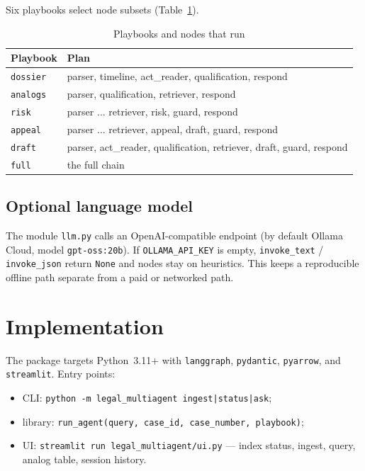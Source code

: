 \documentclass[preprint,12pt]{elsarticle}
\begin{document}
Six playbooks select node subsets (Table~\ref{tab:playbooks}).

\begin{table}[t]
\centering
\caption{Playbooks and nodes that run}
\label{tab:playbooks}
\begin{tabularx}{\linewidth}{lX}
\toprule
Playbook & Plan \\
\midrule
\texttt{dossier} & parser, timeline, act\_reader, qualification, respond \\
\texttt{analogs} & parser, qualification, retriever, respond \\
\texttt{risk} & parser $\ldots$ retriever, risk, guard, respond \\
\texttt{appeal} & parser $\ldots$ retriever, appeal, draft, guard, respond \\
\texttt{draft} & parser, act\_reader, qualification, retriever, draft, guard, respond \\
\texttt{full} & the full chain \\
\bottomrule
\end{tabularx}
\end{table}

\subsection{Optional language model}

The module \texttt{llm.py} calls an OpenAI-compatible endpoint (by default Ollama Cloud, model \texttt{gpt-oss:20b}). If \texttt{OLLAMA\_API\_KEY} is empty, \texttt{invoke\_text} / \texttt{invoke\_json} return \texttt{None} and nodes stay on heuristics. This keeps a reproducible offline path separate from a paid or networked path.

\section{Implementation}

The package targets Python~3.11+ with \texttt{langgraph}, \texttt{pydantic}, \texttt{pyarrow}, and \texttt{streamlit}. Entry points:

\begin{itemize}
\item CLI: \texttt{python -m legal\_multiagent ingest|status|ask};
\item library: \texttt{run\_agent(query, case\_id, case\_number, playbook)};
\item UI: \texttt{streamlit run legal\_multiagent/ui.py} --- index status, ingest, query, analog table, session history.
\end{itemize}
\end{document}
